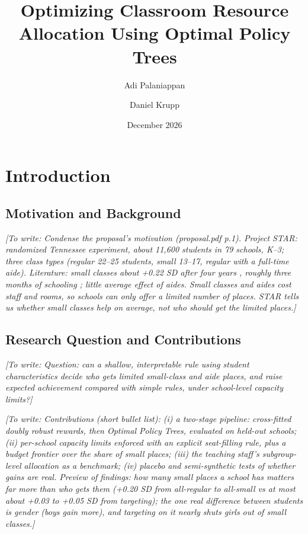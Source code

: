 \documentclass[11pt]{article}
\title{Optimizing Classroom Resource Allocation Using Optimal Policy Trees}
\author{Adi Palaniappan \and Daniel Krupp}
\date{December 2026}
\newcommand{\placeholder}[1]{\par\noindent\textit{[To write: #1]}\par}
\begin{document}
\maketitle

\section{Introduction}  %

\subsection{Motivation and Background}
\placeholder{Condense the proposal's motivation (proposal.pdf p.1). Project STAR:
randomized Tennessee experiment, about 11,600 students in 79 schools, K--3; three class
types (regular 22--25 students, small 13--17, regular with a full-time aide). Literature:
small classes about +0.22 SD after four years \cite{krueger1999}, roughly three months of
schooling \cite{whitehurst2011}; little average effect of aides. Small classes and aides
cost staff and rooms, so schools can only offer a limited number of places. STAR tells us
whether small classes help on average, not who should get the limited places.}

\subsection{Research Question and Contributions}
\placeholder{Question: can a shallow, interpretable rule using student characteristics
decide who gets limited small-class and aide places, and raise expected achievement
compared with simple rules, under school-level capacity limits?}
\placeholder{Contributions (short bullet list):
(i) a two-stage pipeline: cross-fitted doubly robust rewards, then Optimal Policy Trees,
evaluated on held-out schools;
(ii) per-school capacity limits enforced with an explicit seat-filling rule, plus a
budget frontier over the share of small places;
(iii) the teaching staff's subgroup-level allocation as a benchmark;
(iv) placebo and semi-synthetic tests of whether gains are real.
Preview of findings: how many small places a school has matters far more than who gets
them (+0.20 SD from all-regular to all-small vs at most about +0.03 to +0.05 SD from
targeting); the one real difference between students is gender (boys gain more), and
targeting on it nearly shuts girls out of small classes.}
\end{document}
